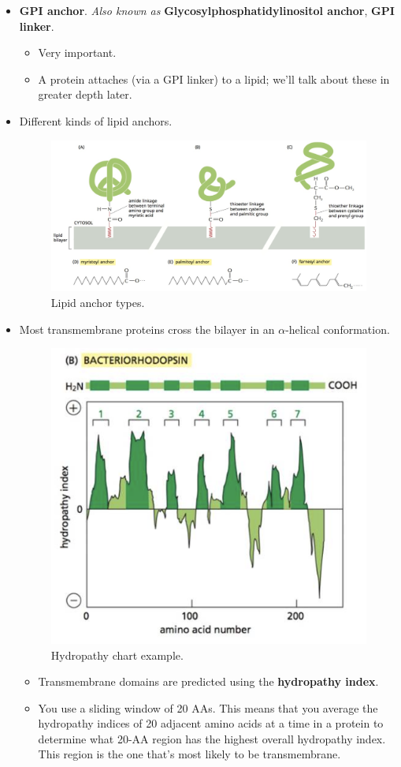 \documentclass[../notes.tex]{subfiles}
\begin{document}
\begin{itemize}
    \item \textbf{GPI anchor}. \emph{Also known as} \textbf{Glycosylphosphatidylinositol anchor}, \textbf{GPI linker}.
    \begin{itemize}
        \item Very important.
        \item A protein attaches (via a GPI linker) to a lipid; we'll talk about these in greater depth later.
    \end{itemize}
    \item Different kinds of lipid anchors.
    \begin{figure}[h!]
        \centering
        \includegraphics[width=0.7\linewidth]{../ExtFiles/lipidAnchorTypes.png}
        \caption{Lipid anchor types.}
        \label{fig:lipidAnchorTypes}
    \end{figure}
    \item Most transmembrane proteins cross the bilayer in an $\alpha$-helical conformation.
    \begin{figure}[H]
        \centering
        \includegraphics[width=0.4\linewidth]{../ExtFiles/hydropathyChart.png}
        \caption{Hydropathy chart example.}
        \label{fig:hydropathyChart}
    \end{figure}
    \begin{itemize}
        \item Transmembrane domains are predicted using the \textbf{hydropathy index}.
        \item You use a sliding window of 20 AAs. This means that you average the hydropathy indices of 20 adjacent amino acids at a time in a protein to determine what 20-AA region has the highest overall hydropathy index. This region is the one that's most likely to be transmembrane.

\end{itemize}
\end{itemize}
\end{document}
